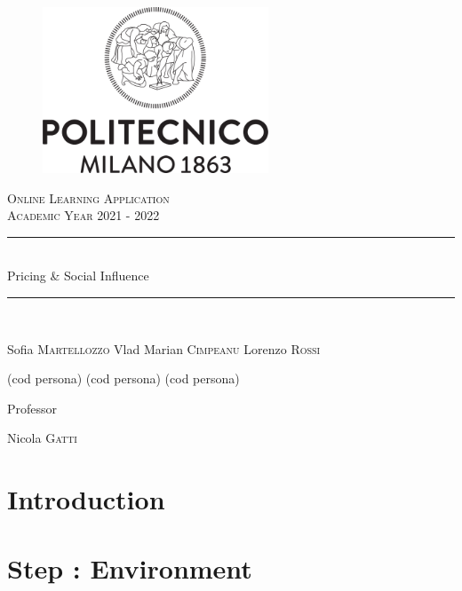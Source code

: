 \documentclass{article}
\begin{document}
\begin{titlepage}
      \centering
      \begin{figure}
            \begin{center}
                  \includegraphics[width=0.6\textwidth]{img/logo_polimi.png}
            \end{center}
      \end{figure}
      \vfill
      {\scshape\LARGE Online Learning Application\\Academic Year 2021 - 2022 \par}
      
      
      \vfill
      \newcommand{\HRule}{\rule{\linewidth}{0.3mm}}
      \centering
      \HRule \\[0.4cm]
      \huge  Pricing \& Social Influence\\%
      \HRule \\
      \vspace{1cm}
      {\Large Sofia \textsc{Martellozzo} \quad  Vlad Marian \textsc{Cimpeanu}  \quad  Lorenzo \textsc{Rossi}\par}
      {\Large(cod persona) \quad (cod persona) \quad (cod persona) \par}
      \vfill
      {\large Professor\par
          Nicola \textsc{Gatti}}
\end{titlepage}


\newpage
\renewcommand\contentsname{Contents}
\tableofcontents

\newpage

\section*{Introduction}


\newpage
\section{Step : Environment}
\end{document}
